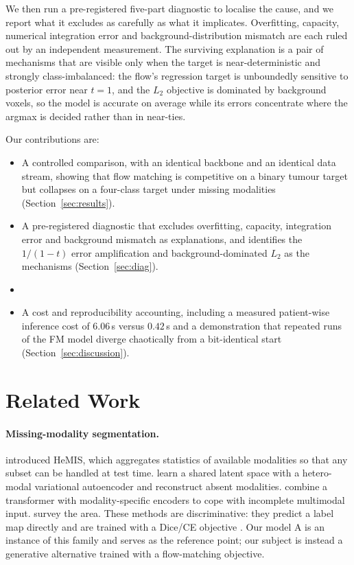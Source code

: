 \documentclass[conference]{IEEEtran}
\begin{document}
We then run a pre-registered five-part diagnostic to localise the cause, and we
report what it excludes as carefully as what it implicates. Overfitting,
capacity, numerical integration error and background-distribution mismatch are
each ruled out by an independent measurement. The surviving explanation is a
pair of mechanisms that are visible only when the target is near-deterministic
and strongly class-imbalanced: the flow's regression target is unboundedly
sensitive to posterior error near $t=1$, and the $L_2$ objective is dominated by
background voxels, so the model is accurate on average while its errors
concentrate where the argmax is decided rather than in near-ties.

\REMEDYINTRO

Our contributions are:
\begin{itemize}
\item A controlled comparison, with an identical backbone and an identical data
stream, showing that flow matching is competitive on a binary tumour target but
collapses on a four-class target under missing modalities
(Section~\ref{sec:results}).
\item A pre-registered diagnostic that excludes overfitting, capacity,
integration error and background mismatch as explanations, and identifies the
$1/(1-t)$ error amplification and background-dominated $L_2$ as the mechanisms
(Section~\ref{sec:diag}).
\item \REMEDYCONTRIB
\item A cost and reproducibility accounting, including a measured
patient-wise inference cost of $6.06$\,s versus $0.42$\,s and a demonstration
that repeated runs of the FM model diverge chaotically from a bit-identical
start (Section~\ref{sec:discussion}).
\end{itemize}

\section{Related Work}

\paragraph{Missing-modality segmentation.}
\cite{havaei2016hemis} introduced HeMIS, which aggregates statistics of
available modalities so that any subset can be handled at test time.
\cite{dorent2019hetero} learn a shared latent space with a hetero-modal
variational autoencoder and reconstruct absent modalities.
\cite{zhang2022mmformer} combine a transformer with modality-specific encoders
to cope with incomplete multimodal input. \cite{zhou2023literature} survey the
area. These methods are discriminative: they predict a label map directly and
are trained with a Dice/CE objective \cite{isensee2021nnunet}. Our model A is an
instance of this family and serves as the reference point; our subject is
instead a generative alternative trained with a flow-matching objective.
\end{document}
